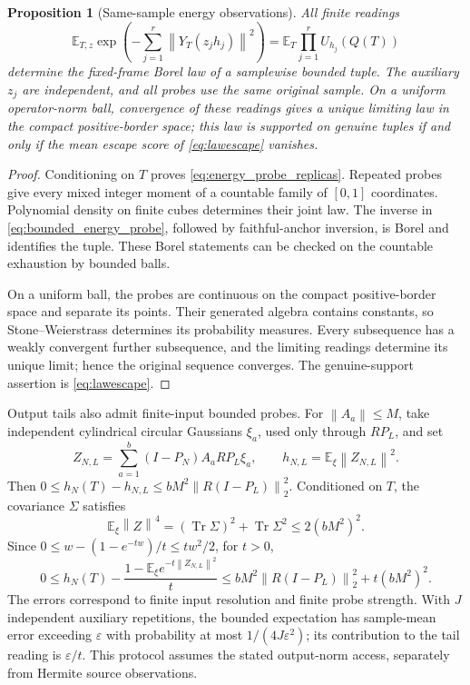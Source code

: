 \documentclass[11pt,a4paper]{amsart}
\numberwithin{equation}{section}
\newtheorem{proposition}[theorem]{Proposition}
\theoremstyle{definition}
\theoremstyle{remark}
\newcommand{\E}{\mathbb E}
\DeclareMathOperator{\Tr}{Tr}
\newcommand{\norm}[1]{\left\lVert#1\right\rVert}
\begin{document}
\begin{proposition}[Same-sample energy observations]\label{prop:energyprobes}
All finite readings
\begin{equation}\label{eq:energy_probe_replicas}
 \E_{T,z}\exp\left(-\sum_{j=1}^r\norm{Y_T(z_jh_j)}^2\right)
 =\E_T\prod_{j=1}^rU_{h_j}(Q(T))
\end{equation}
determine the fixed-frame Borel law of a samplewise bounded tuple. The auxiliary $z_j$ are independent, and all probes use the same original sample. On a uniform operator-norm ball, convergence of these readings gives a unique limiting law in the compact positive-border space; this law is supported on genuine tuples if and only if the mean escape score of \eqref{eq:lawescape} vanishes.
\end{proposition}
\begin{proof}
Conditioning on $T$ proves \eqref{eq:energy_probe_replicas}. Repeated probes give every mixed integer moment of a countable family of $[0,1]$ coordinates. Polynomial density on finite cubes determines their joint law. The inverse in \eqref{eq:bounded_energy_probe}, followed by faithful-anchor inversion, is Borel and identifies the tuple. These Borel statements can be checked on the countable exhaustion by bounded balls.

On a uniform ball, the probes are continuous on the compact positive-border space and separate its points. Their generated algebra contains constants, so Stone--Weierstrass determines its probability measures. Every subsequence has a weakly convergent further subsequence, and the limiting readings determine its unique limit; hence the original sequence converges. The genuine-support assertion is \eqref{eq:lawescape}.
\end{proof}

Output tails also admit finite-input bounded probes. For $\norm{A_a}\le M$, take independent cylindrical circular Gaussians $\xi_a$, used only through $RP_L$, and set
\[
 Z_{N,L}=\sum_{a=1}^b(I-P_N)A_aRP_L\xi_a,\qquad
 h_{N,L}=\E_\xi\norm{Z_{N,L}}^2.
\]
Then
$0\le h_N(T)-h_{N,L}\le bM^2\norm{R(I-P_L)}_2^2$.
Conditioned on $T$, the covariance $\Sigma$ satisfies
\[
 \E_\xi\norm Z^4=(\Tr\Sigma)^2+\Tr\Sigma^2\le2(bM^2)^2.
\]
Since $0\le w-(1-e^{-tw})/t\le tw^2/2$, for $t>0$,
\begin{equation}\label{eq:finite_energy_tail}
 0\le h_N(T)-\frac{1-\E_\xi e^{-t\norm{Z_{N,L}}^2}}t
 \le bM^2\norm{R(I-P_L)}_2^2+t(bM^2)^2.
\end{equation}
The errors correspond to finite input resolution and finite probe strength. With $J$ independent auxiliary repetitions, the bounded expectation has sample-mean error exceeding $\varepsilon$ with probability at most $1/(4J\varepsilon^2)$; its contribution to the tail reading is $\varepsilon/t$. This protocol assumes the stated output-norm access, separately from Hermite source observations.
\end{document}
